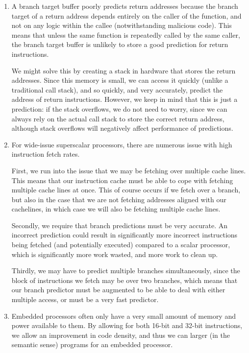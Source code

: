 


\begin{enumerate}[label=(\alph*)]
  \item
    A branch target buffer poorly predicts return addresses because the branch target of a return address depends entirely on the caller of the function, and not on any logic within the callee (notwithstanding malicious code). This means that unless the same function is repeatedly called by the same caller, the branch target buffer is unlikely to store a good prediction for return instructions.

    We might solve this by creating a stack in hardware that stores the return addresses. Since this memory is small, we can access it quickly (unlike a traditional call stack), and so quickly, and very accurately, predict the address of return instructions. However, we keep in mind that this is just a prediction: if the stack overflows, we do not need to worry, since we can always rely on the actual call stack to store the correct return address, although stack overflows will negatively affect performance of predictions.

  \item
    For wide-issue superscalar processors, there are numerous issue with high instruction fetch rates.

    First, we run into the issue that we may be fetching over multiple cache lines. This means that our instruction cache must be able to cope with fetching multiple cache lines at once. This of course occurs if we fetch over a branch, but also in the case that we are not fetching addresses aligned with our cachelines, in which case we will also be fetching multiple cache lines.

    Secondly, we require that branch predictions must be very accurate. An incorrect prediction could result in significantly more incorrect instructions being fetched (and potentially executed) compared to a scalar processor, which is significantly more work wasted, and more work to clean up.

    Thirdly, we may have to predict multiple branches simultaneously, since the block of instructions we fetch may be over two branches, which means that our branch predictor must be augmented to be able to deal with either multiple access, or must be a very fast predictor.

  \item
    Embedded processors often only have a very small amount of memory and power available to them. By allowing for both 16-bit and 32-bit instructions, we allow an improvement in code density, and thus we can larger (in the semantic sense) programs for an embedded processor.


\end{enumerate}
